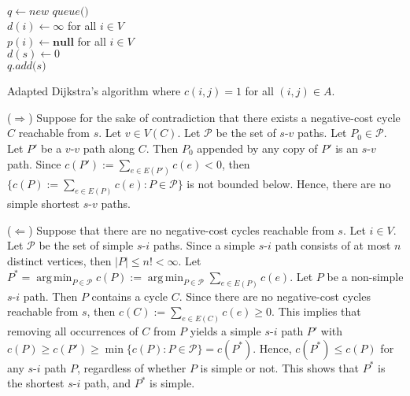 \documentclass[letterpaper,reqno,12pt]{article}
\DeclareMathOperator{\argmin}{arg\,min}
\begin{document}
\begin{exercise}
  \begin{algorithm}
    $q \leftarrow \textit{new queue()}$ \\
    $d(i) \leftarrow \infty$ for all $i \in V$ \\
    $p(i) \leftarrow \textbf{null}$ for all $i \in V$ \\
    $d(s) \leftarrow 0$ \\
    $q.\textit{add($s$)}$ \\
    \caption{Adapted Dijkstra's algorithm where $c(i, j) = 1$ for all $(i, j) \in A$.}
    \label{alg:adapted-dijkstra}
  \end{algorithm}
\end{exercise}

\begin{exercise} \label{ex:shortest-existence}
  ($\Longrightarrow$) Suppose for the sake of contradiction that there exists a negative-cost cycle $C$ reachable from $s$. Let $v \in V(C)$. Let $\mathcal P$ be the set of $s$-$v$ paths. Let $P_0 \in \mathcal P$. Let $P'$ be a $v$-$v$ path along $C$. Then $P_0$ appended by any copy of $P'$ is an $s$-$v$ path. Since $c(P') := \sum_{e \in E(P')} c(e) < 0$, then $\{ c(P) := \sum_{e \in E(P)} c(e) : P \in \mathcal P \}$ is not bounded below. Hence, there are no simple shortest $s$-$v$ paths.

  ($\Longleftarrow$) Suppose that there are no negative-cost cycles reachable from $s$. Let $i \in V$. Let $\mathcal P$ be the set of simple $s$-$i$ paths. Since a simple $s$-$i$ path consists of at most $n$ distinct vertices, then $|P| \leq n! < \infty$. Let $P^* = \argmin_{P \in \mathcal P} c(P) := \argmin_{P \in \mathcal P} \sum_{e \in E(P)} c(e)$. Let $P$ be a non-simple $s$-$i$ path. Then $P$ contains a cycle $C$. Since there are no negative-cost cycles reachable from $s$, then $c(C) := \sum_{e \in E(C)} c(e) \geq 0$. This implies that removing all occurrences of $C$ from $P$ yields a simple $s$-$i$ path $P'$ with $c(P) \geq c(P') \geq \min \{ c(P) : P \in \mathcal P \} = c(P^*)$. Hence, $c(P^*) \leq c(P)$ for any $s$-$i$ path $P$, regardless of whether $P$ is simple or not. This shows that $P^*$ is the shortest $s$-$i$ path, and $P^*$ is simple.
\end{exercise}
\end{document}
